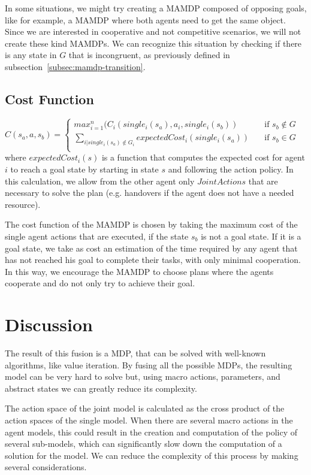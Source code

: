 In some situations, we might try creating a MAMDP composed of opposing goals, like for example, a MAMDP where both agents need to get the same object. Since we are interested in cooperative and not competitive scenarios, we will not create these kind MAMDPs. We can recognize this situation by checking if there is any state in $G$ that is incongruent, as previously defined in subsection~\ref{subsec:mamdp-transition}. 


\subsection{Cost Function}
$C(s_a,a,s_b)= 
	\begin{cases}
		max_{i=1}^{n}(C_i(single_i(s_a),a_i,single_i(s_b))  & \quad \text{if } s_b \not\in G \\
		\sum_{i | single_i(s_a) \not\in G_i} expectedCost_i(single_i(s_a))  & \quad \text{if } s_b \in  G
		\\
	\end{cases} $	\\

where $expectedCost_i(s)$ is a function that computes the expected cost for agent $i$ to reach a goal state by starting in state $s$ and following the action policy. In this calculation, we allow from the other agent only $JointActions$ that are necessary to solve the plan (e.g. handovers if the agent does not have a needed resource).

The cost function of the MAMDP is chosen by taking the maximum cost of the single agent actions that are executed, if the state $s_b$ is not a goal state. If it is a goal state, we take as cost an estimation of the time required by any agent that has not reached his goal to complete their tasks, with only minimal cooperation. In this way, we encourage the MAMDP to choose plans where the agents cooperate and do not only try to achieve their goal.

\section{Discussion}
\label{sec:mamdp-discussion}

The result of this fusion is a MDP, that can be solved with well-known algorithms, like value iteration. By fusing all the possible MDPs, the resulting model can be  very hard to solve but, using macro actions, parameters, and abstract states we can greatly reduce its complexity. 

The action space of the joint model is calculated as the cross product of the action spaces of the single model. When there are several macro actions in the agent models, this could result in the creation and computation of the policy of several sub-models, which can significantly slow down the computation of a solution for the model. We can reduce the complexity of this process by making several considerations.

